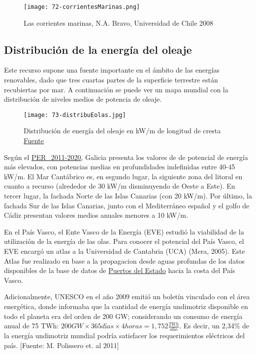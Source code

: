 \begin{figure}
\centering
\texttt{[image: 72-corrientesMarinas.png]}
\caption[Corrientes marinas]{Las corrientes marinas, N.A. Bravo, Universidad de Chile 2008}
\label{fig:corrientes}
\end{figure}

\subsection{Distribución de la energía del oleaje}\label{header-n47}

Este recurso supone una fuente importante en el ámbito de las energías
renovables, dado que tres cuartas partes de la superficie terrestre
están recubiertas por mar. A continuación se puede ver un mapa mundial
con la distribución de niveles medios de potencia de oleaje.

\begin{figure}
\centering
\texttt{[image: 73-distribuEolas.jpg]}
\caption[Distribución de energía del oleaje]{Distribución de energía del oleaje en kW/m de longitud de cresta \href{https://web.archive.org/web/20060127164948/http://www.wave-energy.net:80/home.htm}{Fuente}}
\label{fig:distribE}
\end{figure}

Según el
\href{http://www.idae.es/uploads/documentos/documentos_PER_2011-2020_Borrador26julio-I_c53dc770.pdf}{PER\_2011-2020},
Galicia presenta los valores de de potencial de energía más elevados,
con potencias medias en profundidades indefinidas entre 40-45 kW/m. El
Mar Cantábrico es, en segundo lugar, la siguiente zona del litoral en
cuanto a recurso (alrededor de 30 kW/m disminuyendo de Oeste a Este). En
tercer lugar, la fachada Norte de las Islas Canarias (con 20 kW/m). Por
último, la fachada Sur de las Islas Canarias, junto con el Mediterráneo
español y el golfo de Cádiz presentan valores medios anuales menores a
10 kW/m.

En el País Vasco, el Ente Vasco de la Energía (EVE) estudió la
viabilidad de la utilización de la energía de las olas. Para conocer el
potencial del País Vasco, el EVE encargó un atlas a la Universidad de
Cantabria (UCA) (Mera, 2005). Este Atlas fue realizado en base a la
propagacion desde aguas profundas de los datos disponibles de la base de
datos de \href{www.puertos.es}{Puertos del Estado} hacia la costa del
País Vasco.

Adicionalmente, UNESCO en el año 2009 emitió un boletín vinculado con el
área energética, donde informaba que la cantidad de energía undimotriz
disponible en todo el planeta era del orden de 200 GW; considerando un
consumo de energía anual de 75 TWh:
\(200GW\times365 días\times4 horas=1,752 \frac {TWh}{año}\). Es decir,
un 2,34\% de la energía undimotriz mundial podría satisfacer los
requerimientos eléctricos del país. {[}Fuente: M. Polissero et. al
2011{]}

